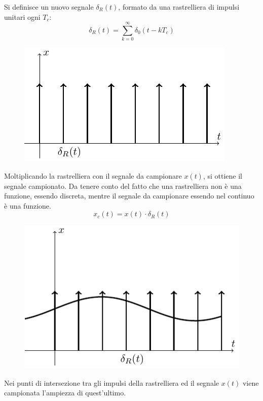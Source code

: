 \documentclass{article}
\numberwithin{equation}{subsection}
\begin{document}
Si definisce un nuovo segnale $\delta_R(t)$, formato da una rastrelliera di impulsi unitari ogni $T_c$:
\begin{equation}
    \delta_R(t)=\sum_{k=0}^{\infty}\delta_0(t-kT_c)
\end{equation} 
\begin{figure}[H]%
    \centering
    \includegraphics{rastrelliera.pdf}%
\end{figure}
Moltiplicando la rastrelliera con il segnale da campionare $x(t)$, si ottiene il segnale campionato. Da tenere conto del fatto che una rastrelliera non è una funzione, 
essendo discreta, mentre il segnale da campionare essendo nel continuo è una funzione. 
\begin{equation*}
    x_c(t)=x(t)\cdot\delta_R(t)
\end{equation*}
\begin{figure}[H]%
    \centering
    \includegraphics{campionamento-3.pdf}%
\end{figure}
Nei punti di intersezione tra gli impulsi della rastrelliera ed il segnale $x(t)$ viene campionata l'ampiezza di quest'ultimo. 
\end{document}
